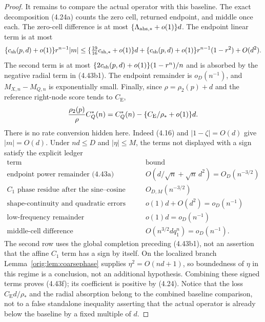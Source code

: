 \documentclass[11pt,a4paper]{article}
\numberwithin{equation}{section}
\theoremstyle{definition}
\theoremstyle{remark}
\newcommand{\CE}{C_{\mathrm E}}
\begin{document}
\begin{proof}
It remains to compare the actual operator with this baseline.  The exact
decomposition (4.24a) counts the zero cell, returned endpoint, and middle
once each.  The zero-cell difference is at most
$\{\Lambda_{\rm abs,*}+o(1)\}d$.  The endpoint linear term is at most
\[
 \{c_{\rm sh}(p,d)+o(1)\}r^{n-1}|m|
 \le \{\tfrac{19}{16}c_{\rm sh,*}+o(1)\}d
      +\{c_{\rm sh}(p,d)+o(1)\}r^{n-1}(1-r^2)+O(d^2).
\]
The second term is at most
$\{2c_{\rm sh}(p,d)+o(1)\}(1-r^n)/n$ and is absorbed by the negative radial
term in (4.43b1).  The endpoint remainder is $o_D(n^{-1})$, and
$M_{X,n}-M_{Q,n}$ is exponentially small.  Finally, since
$\rho=\rho_2(p)+d$ and the reference right-node score tends to $\CE$,
\[
 {\rho_2(p)\over\rho}C_Q^*(n)
 =C_Q^*(n)-\{\CE/\rho_*+o(1)\}d.
\]
There is no rate conversion hidden here.  Indeed (4.16) and
$|1-\zeta|=O(d)$ give $|m|=O(d)$.  Under $nd\le D$ and $|\eta|\le M$,
the terms not displayed with a sign satisfy the explicit ledger
\[
\begin{array}{c|c}
\text{term}&\text{bound}\\ \hline
\text{endpoint power remainder (4.43a)}
 &O(d/\sqrt n+\sqrt n\,d^2)=O_D(n^{-3/2})\\
\text{$C_1$ phase residue after the sine--cosine completion}
 &O_{D,M}(n^{-3/2})\\
\text{shape-continuity and quadratic errors}&o(1)d+O(d^2)=o_D(n^{-1})\\
\text{low-frequency remainder}&o(1)d=o_D(n^{-1})\\
\text{middle-cell difference}&O(n^{3/2}dq_1^n)=o_D(n^{-1}).
\end{array}                                                   \tag{4.43f0}
\]
The second row uses the global completion preceding (4.43b1), not an
assertion that the affine $C_1$ term has a sign by itself.  On the
localized branch Lemma~\ref{orig:lem:coarsephase} supplies
$\eta^2=O(nd+1)$, so boundedness of $\eta$ in this regime is a conclusion,
not an additional hypothesis.
Combining these signed terms proves (4.43f); its coefficient is positive
by (4.24).  Notice that the loss $\CE d/\rho_*$ and the radial absorption
belong to the combined baseline comparison, not to a false standalone
inequality asserting that the actual operator is already below the
baseline by a fixed multiple of $d$.


\end{proof}
\end{document}
